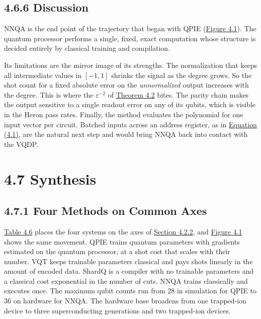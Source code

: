 \documentclass{report}
\theoremstyle{plain}
\theoremstyle{definition}
\theoremstyle{remark}
\newcommand{\eps}{\varepsilon}
\begin{document}
\subsection{4.6.6 Discussion}\label{sec:qml:nnqa:discussion}

NNQA is the end point of the trajectory that began with QPIE (\hyperref[fig:qml:overview]{Figure 4.1}). The quantum processor performs a single, fixed, exact computation whose structure is decided entirely by classical training and compilation.

Its limitations are the mirror image of its strengths. The normalization that keeps all intermediate values in $[-1,1]$ shrinks the signal as the degree grows. So the shot count for a fixed absolute error on the \emph{unnormalized} output increases with the degree. This is where the $\eps^{-2}$ of \hyperref[thm:qml:nnqa-ua]{Theorem 4.2} bites. The parity chain makes the output sensitive to a single readout error on any of its qubits, which is visible in the Heron pass rates. Finally, the method evaluates the polynomial for one input vector per circuit. Batched inputs across an address register, as in \hyperref[eq:qml:qcrank]{Equation (4.1)}, are the natural next step and would bring NNQA back into contact with the VQDP.

\section{4.7 Synthesis}\label{sec:qml:synthesis}

\subsection{4.7.1 Four Methods on Common Axes}\label{sec:qml:synthesis:axes}

\hyperref[tab:qml:synthesis]{Table 4.6} places the four systems on the axes of \hyperref[sec:qml:prelim:axes]{Section 4.2.2}, and \hyperref[fig:qml:overview]{Figure 4.1} shows the same movement. QPIE trains quantum parameters with gradients estimated on the quantum processor, at a shot cost that scales with their number. VQT keeps trainable parameters classical and pays shots linearly in the amount of encoded data. ShardQ is a compiler with no trainable parameters and a classical cost exponential in the number of cuts. NNQA trains classically and executes once. The maximum qubit counts run from 28 in simulation for QPIE to 36 on hardware for NNQA. The hardware base broadens from one trapped-ion device to three superconducting generations and two trapped-ion devices.
\end{document}
